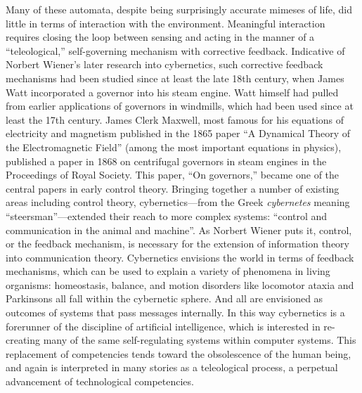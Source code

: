 Many of these automata, despite being surprisingly accurate
mimeses of life, did little in terms of interaction with the
environment. Meaningful interaction requires closing the loop between
sensing and acting in the manner of a
 ``teleological,'' self-governing mechanism with corrective feedback.
 Indicative of Norbert Wiener's later research into cybernetics, such
 corrective feedback mechanisms had been studied since at least the
 late 18th century, when James Watt incorporated a governor into his
 steam engine. Watt himself had pulled from earlier applications of
 governors in windmills, which had been used since at least the 17th
 century.\cite{richardhills} James Clerk Maxwell, most famous for his equations of
 electricity and magnetism published in the 1865 paper ``A Dynamical
 Theory of the Electromagnetic Field'' (among the most important
 equations in physics), published a paper in 1868 on centrifugal
 governors in steam engines in the Proceedings of Royal Society. This
 paper, ``On governors,'' became one of the central papers in early
 control theory.\cite{ottomayr} Bringing together a number of existing
 areas including control theory,
 cybernetics---from the Greek \emph{cybernetes} meaning
 ``steersman''\cite[p. 6]{wienerMainIdeas}---extended their reach to more complex
 systems: ``control and communication in the animal and machine''. As
 Norbert Wiener puts it, control, or the
 feedback mechanism, is necessary for the extension of information
 theory into communication theory. Cybernetics envisions the world in
 terms of feedback mechanisms, which can be used to explain a variety
 of phenomena in living organisms: homeostasis, balance, and motion
 disorders like locomotor ataxia and Parkinsons all fall within the
 cybernetic sphere\cite[p. 10-15]{wienerMainIdeas}. And all are envisioned
 as outcomes of systems that pass messages internally. In this way
 cybernetics is a forerunner of the discipline of
 artificial intelligence, which is interested in re-creating many of the same
 self-regulating systems within computer systems. This replacement of
 competencies tends toward the obsolescence of the human being, and
 again is interpreted in many stories as a teleological process, a
 perpetual advancement of technological competencies.




